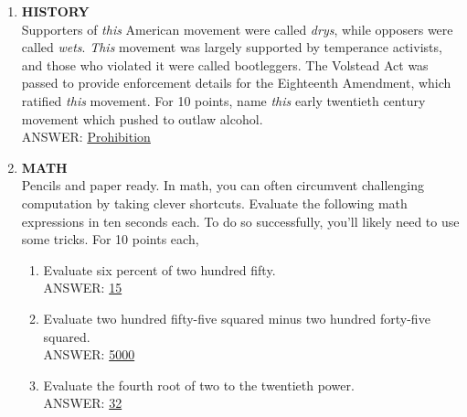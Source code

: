 \documentclass{report}
\newcommand*{\backtrack}{\setcounter{enumi}{\numexpr\theenumi-1\relax}}
\begin{document}
\begin{enumerate}
    \item \textbf{HISTORY} \\ Supporters of \textit{this} American movement were called \textit{drys}, while opposers were called \textit{wets}. \textit{This} movement was largely supported by temperance activists, and those who violated it were called bootleggers. The Volstead Act was passed to provide enforcement details for the Eighteenth Amendment, which ratified \textit{this} movement. For 10 points, name \textit{this} early twentieth century movement which pushed to outlaw alcohol. \\ ANSWER: \underline{Prohibition} \backtrack
    \item \textbf{MATH} \\ Pencils and paper ready. In math, you can often circumvent challenging computation by taking clever shortcuts. Evaluate the following math expressions in ten seconds each. To do so successfully, you'll likely need to use some tricks. For 10 points each,
    \begin{enumerate}[label=\Alph*]
        \item Evaluate six percent of two hundred fifty. \\ ANSWER: \underline{15}
        \item Evaluate two hundred fifty-five squared minus two hundred forty-five squared. \\ ANSWER: \underline{5000}
        \item Evaluate the fourth root of two to the twentieth power. \\ ANSWER: \underline{32}
    \end{enumerate}


\end{enumerate}
\end{document}
